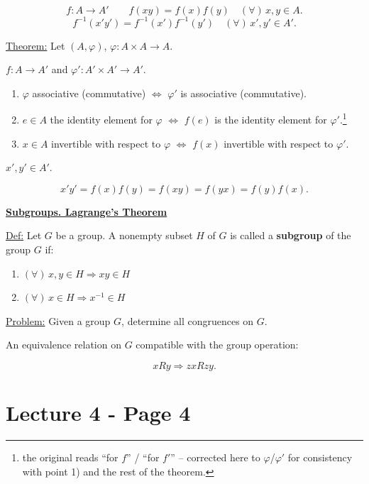 \[
f : A\to A' \qquad f(xy) = f(x)f(y) \quad (\forall)\,x,y\in A.
\]
\[
f^{-1}(x'y') = f^{-1}(x')f^{-1}(y') \quad (\forall)\,x',y'\in A'.
\]

\bigskip
\noindent\underline{Theorem:} Let $(A,\varphi)$, $\varphi:A\times A\to A$.

\noindent $f:A\to A'$ and $\varphi':A'\times A'\to A'$.

\begin{enumerate}
\item[1)] $\varphi$ associative (commutative) $\Leftrightarrow$ $\varphi'$ is associative (commutative).
\item[2)] $e\in A$ the identity element for $\varphi$ $\Leftrightarrow$ $f(e)$ is the identity element for $\varphi'$.\footnote{the original reads ``for $f$'' / ``for $f'$'' -- corrected here to $\varphi$/$\varphi'$ for consistency with point 1) and the rest of the theorem.}
\item[3)] $x\in A$ invertible with respect to $\varphi$ $\Leftrightarrow$ $f(x)$ invertible with respect to $\varphi'$.
\end{enumerate}

\noindent $x',y'\in A'$.

\[
x'y' = f(x)f(y) = f(xy) = f(yx) = f(y)f(x).
\]

\bigskip
\begin{center}
\end{center}

\noindent\underline{\textbf{Subgroups. Lagrange's Theorem}}

\bigskip
\noindent\underline{Def:} Let $G$ be a group. A nonempty subset $H$ of $G$ is called a \textbf{subgroup} of the group $G$ if:

\begin{enumerate}
\item[(1)] $(\forall)\,x,y\in H \Rightarrow xy\in H$
\item[(2)] $(\forall)\,x\in H \Rightarrow x^{-1}\in H$
\end{enumerate}

\bigskip
\noindent\underline{Problem:} Given a group $G$, determine all congruences on $G$.

\noindent An equivalence relation on $G$ compatible with the group operation:

\[
xRy \Rightarrow zxRzy.
\]



\section*{Lecture 4 - Page 4}

